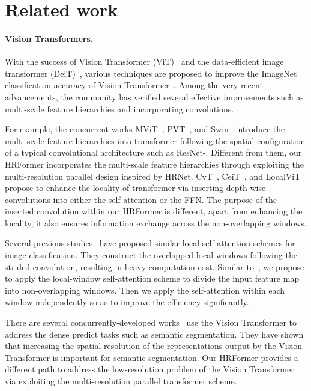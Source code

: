 \documentclass{article}
\begin{document}
\section{Related work}


\paragraph{Vision Transformers.}
With the success of Vision Transformer (ViT)~\cite{dosovitskiy2020image} and the data-efficient image transformer (DeiT)~\cite{touvron2020deit},
various techniques are proposed to improve the ImageNet classification
accuracy of Vision Transformer~\cite{dascoli2021convit,touvron2021going,wu2021cvt,graham2021levit,yuan2021tokens,han2021transformer,chen2021crossvit,liu2021swin,jiang2021token,srinivas2021bottleneck}.
Among the very recent advancements,
the community has verified several effective improvements such as multi-scale feature hierarchies and incorporating convolutions.

For example,
the concurrent works MViT~\cite{fan2021multiscale}, PVT~\cite{wang2021pyramid}, and Swin~\cite{liu2021swin} introduce the multi-scale feature hierarchies into transformer following the spatial configuration of a typical convolutional architecture such as ResNet-.
Different from them, our HRFormer incorporates the multi-scale feature hierarchies through
exploiting the multi-resolution parallel design inspired by HRNet.
CvT~\cite{wu2021cvt}, CeiT~\cite{yuan2021incorporating}, and LocalViT~\cite{li2021localvit}
propose to enhance the locality of transformer via inserting depth-wise  convolutions into either the self-attention or the FFN.
The purpose of the inserted convolution within our HRFormer is different,
apart from enhancing the locality,
it also ensures information exchange
across the non-overlapping windows.

Several previous studies~\cite{ramachandran2019stand,hu2019local} have proposed
similar local self-attention schemes for image classification.
They construct the overlapped local windows following the strided convolution,
resulting in heavy computation cost.
Similar to~\cite{huang2019interlaced,vaswani2021scaling,liu2021swin},
we propose to apply the local-window self-attention scheme
to divide the input feature map into non-overlapping windows.
Then we apply the self-attention within each window independently so as to improve
the efficiency significantly.

There are several concurrently-developed works~\cite{SETR,Ranftl2021} use the
Vision Transformer to address the dense predict tasks such as semantic segmentation.
They have shown that increasing the spatial resolution of the representations
output by the Vision Transformer is important for semantic segmentation.
Our HRFormer provides a different path to address the low-resolution problem
of the Vision Transformer via exploiting the multi-resolution parallel transformer
scheme.
\end{document}
